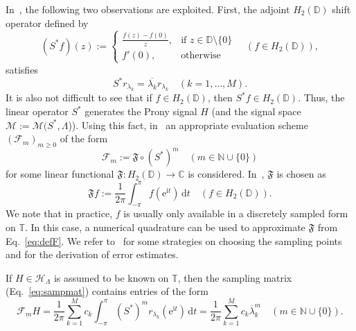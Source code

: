 \documentclass{arxiv}
\newcommand{\e}{\mathrm{e}}
\newcommand{\ri}{\mathrm{i}}
\renewcommand{\d}{\mathrm{d}}
\newcommand{\funF}{\mathfrak{F}}
\newcommand{\cM}{\mathcal{M}}
\begin{document}
In~\cite{dozsa2025system}, the following two observations are exploited. First, the adjoint $H_2(\mathbb{D})$ shift operator defined by
\begin{equation}
    \label{eq:adjshift}
    (S^{\ast}f)(z) := \begin{cases}
     \frac{f(z) - f(0)}{z}, & \text{if } z \in \mathbb{D} \setminus\{0\} \\ f'(0), & \text{otherwise} \end{cases} \quad (f \in H_2(\mathbb{D})),
\end{equation}
satisfies
\begin{equation*}
    S^{\ast}r_{\lambda_k} = \overline{\lambda_k} r_{\lambda_k}  \quad (k=1,\ldots,M).
\end{equation*}
It is also not difficult to see that if $f \in H_2(\mathbb{D})$, then $S^{\ast}f \in H_2(\mathbb{D})$. Thus, the linear operator $S^{\ast}$ generates the Prony signal $H$ (and the signal space $\cM:=\mathcal{M}(S^{\ast},\Lambda$)). Using this fact, in~\cite{dozsa2025system} an appropriate evaluation scheme ${(\mathcal{F}_m)}_{m \ge 0}$ of the form 
\begin{equation}\label{eq:proposamp}
\mathcal{F}_m := \funF \circ \left( S^{\ast} \right)^m \quad (m \in \mathbb{N}\cup\{0\})
\end{equation}
for some linear functional $\funF : H_2(\mathbb{D}) \to \mathbb{C}$ is considered. 
In~\cite{dozsa2025system}, $\funF$ is chosen as
\begin{equation}\label{eq:defF}
     \funF f := \frac{1}{2 \pi} \int_{-\pi}^{\pi} f(\e^{\ri t})\, \d t \quad (f \in H_2(\mathbb{D})).
\end{equation}
We note that in practice, $f$ is usually only available in a discretely sampled form on $\mathbb{T}$. In this case, a numerical quadrature can be used to approximate $\funF$ from Eq.~\eqref{eq:defF}. %
We refer  to~\cite{cohen2017optimal} for some strategies on choosing the sampling points and for the derivation of error estimates.

If $H \in \mathcal{H}_{\Lambda}$ is assumed to be known on $\mathbb{T}$, then the sampling matrix (Eq.~\eqref{eq:sampmat}) contains entries of the form
\begin{equation*}
    \mathcal{F}_m H = \frac{1}{2 \pi} \sum_{k=1}^{M} c_k \int_{-\pi}^{\pi} \left(S^{*}\right)^m r_{\lambda_k}(\e^{\ri t}) \,\d t = \frac{1}{2 \pi} \sum_{k=1}^{M} c_k \overline{\lambda}_k^m \quad (m \in \mathbb{N} \cup \{0\}).
\end{equation*}
\end{document}
